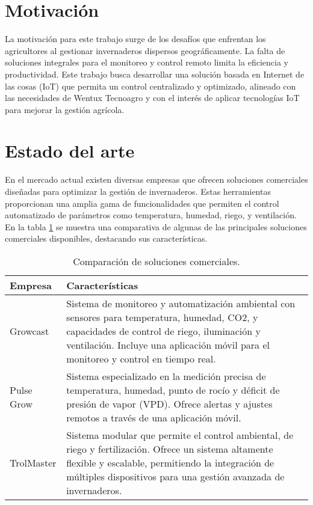 
\section{Motivación}

La motivación para este trabajo surge de los desafíos que enfrentan los agricultores al gestionar invernaderos dispersos geográficamente. La falta de soluciones integrales para el monitoreo y control remoto limita la eficiencia y productividad. Este trabajo busca desarrollar una solución basada en Internet de las cosas (IoT) que permita un control centralizado y optimizado, alineado con las necesidades de Wentux Tecnoagro y con el interés de aplicar tecnologías IoT para mejorar la gestión agrícola.


\section{Estado del arte}
En el mercado actual existen diversas empresas que ofrecen soluciones comerciales diseñadas para optimizar la gestión de invernaderos. Estas herramientas proporcionan una amplia gama de funcionalidades que permiten el control automatizado de parámetros como temperatura, humedad, riego, y ventilación. En la tabla \ref{tabla:empresas_invernaderos} se muestra una comparativa de algunas de las principales soluciones comerciales disponibles, destacando sus características.

\begin{table}[h]
	\centering
	\caption[Comparación de soluciones comerciales]{Comparación de soluciones comerciales.}
	\begin{tabular}{l p{10cm}}    
		\toprule
		\textbf{Empresa} 	 & \textbf{Características}  \\
		\midrule
		Growcast \citep{Growcast} & Sistema de monitoreo y automatización ambiental con sensores para temperatura, humedad, CO2, y capacidades de control de riego, iluminación y ventilación. Incluye una aplicación móvil para el monitoreo y control en tiempo real. \\		
		Pulse Grow \citep{pulsegrow}	 & Sistema especializado en la medición precisa de temperatura, humedad, punto de rocío y déficit de presión de vapor (VPD). Ofrece alertas y ajustes remotos a través de una aplicación móvil. \\
		TrolMaster \citep{trolmaster}	 & Sistema modular que permite el control ambiental, de riego y fertilización. Ofrece un sistema altamente flexible y escalable, permitiendo la integración de múltiples dispositivos para una gestión avanzada de invernaderos. \\
		\bottomrule
	\end{tabular}
	\label{tabla:empresas_invernaderos}
\end{table}


